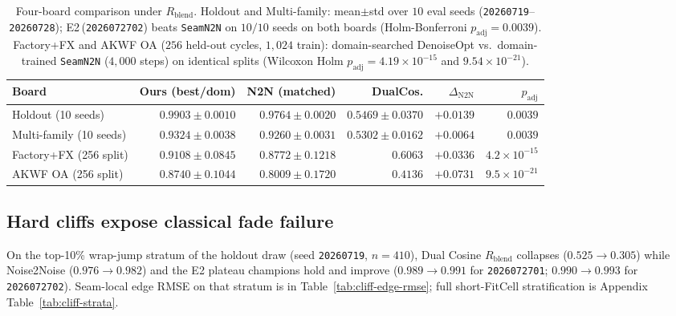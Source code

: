 \begin{table}[t]
  \centering
  \caption{Four-board comparison under $R_{\mathrm{blend}}$.
    Holdout and Multi-family: mean$\pm$std over $10$ eval seeds (\texttt{20260719}--\texttt{20260728}); E2\,(\texttt{2026072702}) beats \texttt{SeamN2N} on $10/10$ seeds on both boards (Holm-Bonferroni $p_{\mathrm{adj}}{=}0.0039$).
    Factory+FX and AKWF OA ($256$ held-out cycles, $1{,}024$ train): domain-searched DenoiseOpt vs.\ domain-trained \texttt{SeamN2N} ($4{,}000$ steps) on identical splits (Wilcoxon Holm $p_{\mathrm{adj}}{=}4.19{\times}10^{-15}$ and $9.54{\times}10^{-21}$).}
  \label{tab:n2n-vs-ours}
  \setlength{\tabcolsep}{7pt}
  \small
  \begin{tabular}{@{}lrrrrr@{}}
    \toprule
    Board & Ours (best/dom) & N2N (matched) & DualCos. & $\Delta_{\mathrm{N2N}}$ & $p_{\mathrm{adj}}$ \\
    \midrule
    Holdout (10 seeds) & $\mathbf{0.9903}{\pm}0.0010$ & $0.9764{\pm}0.0020$ & $0.5469{\pm}0.0370$ & $+0.0139$ & $0.0039$ \\
    Multi-family (10 seeds) & $\mathbf{0.9324}{\pm}0.0038$ & $0.9260{\pm}0.0031$ & $0.5302{\pm}0.0162$ & $+0.0064$ & $0.0039$ \\
    Factory+FX (256 split) & $\mathbf{0.9108}{\pm}0.0845$ & $0.8772{\pm}0.1218$ & $0.6063$ & $+0.0336$ & $4.2{\times}10^{-15}$ \\
    AKWF OA (256 split) & $\mathbf{0.8740}{\pm}0.1044$ & $0.8009{\pm}0.1720$ & $0.4136$ & $+0.0731$ & $9.5{\times}10^{-21}$ \\
    \bottomrule
  \end{tabular}
\end{table}

\subsection{Hard cliffs expose classical fade failure}
\label{sec:cliff-strata}

On the top-10\% wrap-jump stratum of the holdout draw (seed \texttt{20260719}, $n{=}410$), Dual Cosine $R_{\mathrm{blend}}$ collapses ($0.525\to0.305$) while Noise2Noise ($0.976\to0.982$) and the E2 plateau champions hold and improve ($0.989\to0.991$ for \texttt{2026072701}; $0.990\to0.993$ for \texttt{2026072702}).
Seam-local edge RMSE on that stratum is in Table~\ref{tab:cliff-edge-rmse}; full short-FitCell stratification is Appendix Table~\ref{tab:cliff-strata}.

